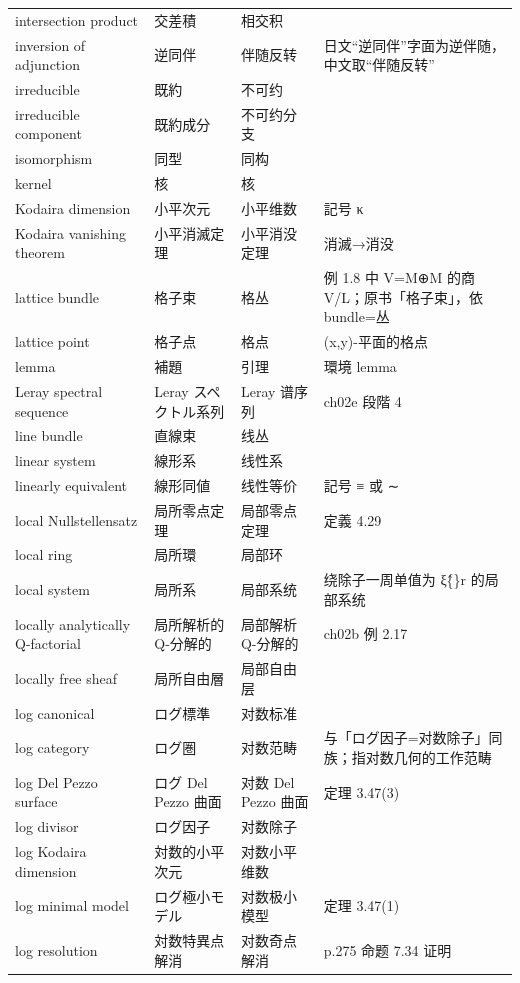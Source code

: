 \begin{longtable}{@{}>{\raggedright\arraybackslash}p{}>{\raggedright\arraybackslash}p{}>{\raggedright\arraybackslash}p{}>{\raggedright\arraybackslash}p{}@{}}
intersection product & 交差積 & 相交积 &  \\
inversion of adjunction & 逆同伴 & 伴随反转 & 日文“逆同伴”字面为逆伴随，中文取“伴随反转” \\
irreducible & 既約 & 不可约 &  \\
irreducible component & 既約成分 & 不可约分支 &  \\
isomorphism & 同型 & 同构 &  \\
kernel & 核 & 核 &  \\
Kodaira dimension & 小平次元 & 小平维数 & 記号 κ \\
Kodaira vanishing theorem & 小平消滅定理 & 小平消没定理 & 消滅→消没 \\
lattice bundle & 格子束 & 格丛 & 例 1.8 中 V=M⊕M 的商 V/L；原书「格子束」，依 bundle=丛 \\
lattice point & 格子点 & 格点 & (x,y)-平面的格点 \\
lemma & 補題 & 引理 & 環境 lemma \\
Leray spectral sequence & Leray スペクトル系列 & Leray 谱序列 & ch02e 段階 4 \\
line bundle & 直線束 & 线丛 &  \\
linear system & 線形系 & 线性系 &  \\
linearly equivalent & 線形同値 & 线性等价 & 記号 ≡ 或 ∼ \\
local Nullstellensatz & 局所零点定理 & 局部零点定理 & 定義 4.29 \\
local ring & 局所環 & 局部环 &  \\
local system & 局所系 & 局部系统 & 绕除子一周单值为 ξ\^\{\}r 的局部系统 \\
locally analytically Q-factorial & 局所解析的 Q-分解的 & 局部解析 Q-分解的 & ch02b 例 2.17 \\
locally free sheaf & 局所自由層 & 局部自由层 &  \\
log canonical & ログ標準 & 对数标准 &  \\
log category & ログ圏 & 对数范畴 & 与「ログ因子=对数除子」同族；指对数几何的工作范畴 \\
log Del Pezzo surface & ログ Del Pezzo 曲面 & 对数 Del Pezzo 曲面 & 定理 3.47(3) \\
log divisor & ログ因子 & 对数除子 &  \\
log Kodaira dimension & 対数的小平次元 & 对数小平维数 &  \\
log minimal model & ログ極小モデル & 对数极小模型 & 定理 3.47(1) \\
log resolution & 対数特異点解消 & 对数奇点解消 & p.275 命题 7.34 证明 \\

\end{longtable}
